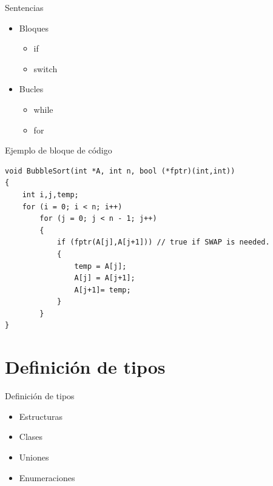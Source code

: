 \documentclass[aspectratio=169,presentation]{beamer}
\begin{document}
\begin{frame}[label={sec:org48583da}]{Sentencias}
\begin{itemize}
\item Bloques
\begin{itemize}
\item if
\item switch
\end{itemize}
\item Bucles
\begin{itemize}
\item while
\item for
\end{itemize}
\end{itemize}
\end{frame}
\begin{frame}[label={sec:org347b919},fragile]{Ejemplo de bloque de código}
 \begin{verbatim}
void BubbleSort(int *A, int n, bool (*fptr)(int,int))
{
	int i,j,temp;
	for (i = 0; i < n; i++)
		for (j = 0; j < n - 1; j++)
		{
			if (fptr(A[j],A[j+1])) // true if SWAP is needed.
			{
				temp = A[j];
				A[j] = A[j+1];
				A[j+1]= temp;
			}
		}
}
\end{verbatim}
\end{frame}
\section{Definición de tipos}
\label{sec:orgae5f848}
\begin{frame}[label={sec:org790b76a}]{Definición de tipos}
\begin{itemize}
\item Estructuras
\item Clases
\item Uniones
\item Enumeraciones
\end{itemize}
\end{frame}
\end{document}
